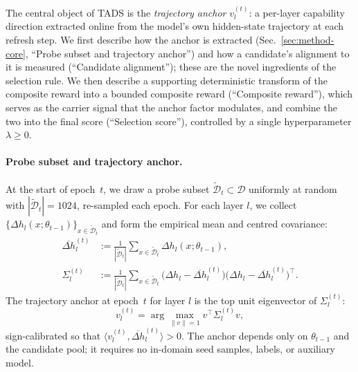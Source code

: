 The central object of \textsc{TADS} is the \emph{trajectory anchor}
$v_l^{(t)}$: a per-layer capability direction extracted online
from the model's own hidden-state trajectory at each refresh step.
We first describe how the anchor is extracted
(Sec.~\ref{sec:method-core}, ``Probe subset and trajectory
anchor'') and how a candidate's alignment to it is measured
(``Candidate alignment''); these are the novel ingredients of the
selection rule. We then describe a supporting deterministic
transform of the composite reward into a bounded composite reward
(``Composite reward''), which serves as the carrier signal that
the anchor factor modulates, and combine the two into the final
score (``Selection score''), controlled by a single hyperparameter
$\lambda \ge 0$.

\paragraph{Probe subset and trajectory anchor.}
At the start of epoch~$t$, we draw a probe subset
$\widetilde{\mathcal{D}}_t \subset \mathcal{D}$ uniformly at random
with $|\widetilde{\mathcal{D}}_t| = 1024$, re-sampled each epoch.
For each layer $l$, we collect
$\{\Delta h_l(x;\theta_{t-1})\}_{x \in \widetilde{\mathcal{D}}_t}$
and form the empirical mean and centred covariance:
\begin{align}
  \overline{\Delta h}_l^{(t)}
   &:= \frac{1}{|\widetilde{\mathcal{D}}_t|}
        \sum_{x \in \widetilde{\mathcal{D}}_t}
        \Delta h_l(x;\theta_{t-1}),
   \label{eq:mu} \\[2pt]
  \Sigma_l^{(t)}
   &:= \frac{1}{|\widetilde{\mathcal{D}}_t|}
        \sum_{x \in \widetilde{\mathcal{D}}_t}
        \bigl(\Delta h_l - \overline{\Delta h}_l^{(t)}\bigr)
        \bigl(\Delta h_l - \overline{\Delta h}_l^{(t)}\bigr)^{\!\top}.
   \label{eq:sigma}
\end{align}
The trajectory anchor at epoch~$t$ for layer $l$ is the top unit
eigenvector of $\Sigma_l^{(t)}$:
\begin{equation}
  v_l^{(t)} = \arg\max_{\|v\| = 1} v^{\!\top}\Sigma_l^{(t)}v ,
  \label{eq:anchor-def}
\end{equation}
sign-calibrated so that
$\langle v_l^{(t)}, \overline{\Delta h}_l^{(t)} \rangle > 0$.
The anchor depends only on $\theta_{t-1}$ and the candidate pool;
it requires no in-domain seed samples, labels, or auxiliary model.

